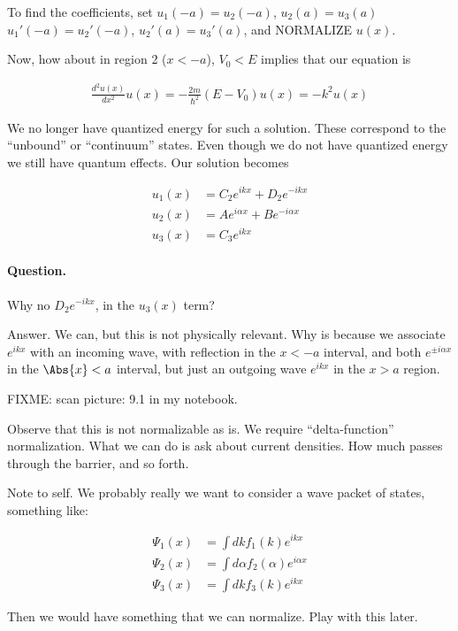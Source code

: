 To find the coefficients, set $u_1(-a) = u_2(-a)$, $u_2(a) = u_3(a)$ $u_1'(-a) = u_2'(-a)$, $u_2'(a) = u_3'(a)$, and NORMALIZE $u(x)$.

Now, how about in region 2 ($x < -a$), $V_0 < E$ implies that our equation is

\begin{align}\label{eqn:PHY356Lecture9:40}
\frac{d^2 u(x)}{dx^2} u(x) = - \frac{2m}{\hbar^2} (E - V_0) u(x) = - k^2 u(x)
\end{align}

We no longer have quantized energy for such a solution.  These correspond to the ``unbound'' or ``continuum'' states.  Even though we do not have quantized energy we still have quantum effects.  Our solution becomes

\begin{align*}
u_1(x) &=
C_2 e^{i k x}
+D_2 e^{-i k x}  \\
u_2(x) &=
A e^{i \alpha x}
+B e^{-i \alpha x}  \\
u_3(x) &=
C_3 e^{i k x}
\end{align*}

\paragraph{Question.}  Why no $D_2 e^{-i k x}$, in the $u_3(x)$ term?

Answer.  We can, but this is not physically relevant.  Why is because we associate $e^{ikx}$ with an incoming wave, with reflection in the $x < -a$ interval, and both $e^{\pm i \alpha x}$ in the $\Abs{x} < a$ interval, but just an outgoing wave $e^{i k x}$ in the $x > a$ region.

FIXME: scan picture: 9.1 in my notebook.

Observe that this is not normalizable as is.  We require ``delta-function'' normalization.  What we can do is ask about current densities.  How much passes through the barrier, and so forth.

Note to self.  We probably really we want to consider a wave packet of states, something like:

\begin{align*}
\Psi_1(x) &= \int dk f_1(k) e^{i k x} \\
\Psi_2(x) &= \int d\alpha f_2(\alpha) e^{i \alpha x} \\
\Psi_3(x) &= \int dk f_3(k) e^{i k x}
\end{align*}

Then we would have something that we can normalize.  Play with this later.

